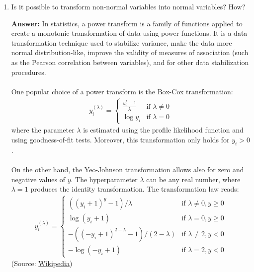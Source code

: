 \documentclass{article}
\newenvironment{QandA}{\begin{enumerate}[label=\arabic*.]}{\end{enumerate}}
\newenvironment{answer}{\par\normalfont \textbf{Answer:}}{}
\begin{document}
\begin{QandA}
    \item Is it possible to transform non-normal variables into normal variables? How?
    \begin{answer}
        In statistics, a power transform is a family of functions applied to create a monotonic transformation of data using power functions. It is a data transformation technique used to stabilize variance, make the data more normal distribution-like, improve the validity of measures of association (such as the Pearson correlation between variables), and for other data stabilization procedures.\\\\
        One popular choice of a power transform is the Box-Cox transformation:
        \begin{align*}
            y_i^{(\lambda)} = \begin{cases}
                \frac{y_i^\lambda - 1}{\lambda} &\text{if }\lambda \neq 0\\
                \log y_i &\text{if } \lambda = 0
            \end{cases}
        \end{align*}
        where the parameter $\lambda$ is estimated using the profile likelihood function and using goodness-of-fit tests. Moreover, this transformation only holds for $y_i > 0$. \\\\
        On the other hand, the Yeo-Johnson transformation allows also for zero and negative values of $y$. The hyperparameter $\lambda$ can be any real number, where $\lambda=1$ produces the identity transformation. The transformation law reads:
        \begin{align*}
            y_i^{(\lambda)} = \begin{cases}
                ((y_i+1)^y - 1)/\lambda &\text{if } \lambda \neq 0, y \ge 0 \\
                \log (y_i + 1) &\text{if } \lambda = 0, y \ge 0 \\
                -((-y_i + 1)^{2-\lambda} -1)/(2-\lambda) &\text{if } \lambda \neq 2, y < 0 \\
                - \log(-y_i + 1) &\text{if } \lambda = 2, y < 0
            \end{cases}
        \end{align*}
        (Source: \href{https://en.wikipedia.org/wiki/Power_transform}{Wikipedia})
    \end{answer}


\end{QandA}
\end{document}
